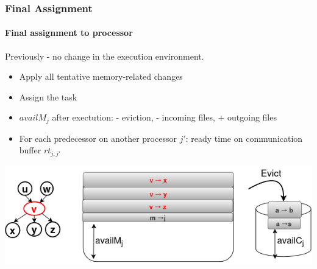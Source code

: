 \documentclass[xcolor=svgnames,titlepage,english,presentation]{beamer}
\begin{document}
\begin{frame}[t]
    \begin{overlayarea}{\paperwidth}{\paperheight}
    \end{overlayarea}

\end{frame}

\begin{frame}[t]
    \frametitle{Final Assignment}
    \framesubtitle{Final assignment to processor}

    Previously - no change in the execution environment.
    \begin{itemize}
        \item Apply all tentative memory-related changes
        \item Assign the task
        \pause
        \item $availM_j$ after exectution: - eviction, - incoming files, + outgoing files
        \item For each predecessor on another processor $j'$: ready time on communication buffer $rt_{j, j'}$
    \end{itemize}

    \begin{center}
        \includegraphics[scale=0.4]{diagrams/images/mem-after}
    \end{center}

\end{frame}

\end{document}
